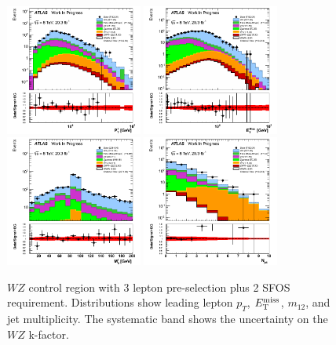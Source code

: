 \begin{figure}[htp]
\centering
\includegraphics[width=0.4\textwidth]{figures/WZ_CR/LeadingLeptonPt_histratio.png}
\includegraphics[width=0.4\textwidth]{figures/WZ_CR/MET_Et_histratio.png}
\includegraphics[width=0.4\textwidth]{figures/WZ_CR/InvariantMassSFOS_histratio.png}
\includegraphics[width=0.4\textwidth]{figures/WZ_CR/NJets_histratio.png}
\caption{$WZ$ control region with 3 lepton pre-selection plus 2 SFOS requirement. 
Distributions show leading lepton $p_{T}$, $E_{\mathrm{T}}^{\mathrm{miss}}$, $m_{12}$, and jet multiplicity. 
The systematic band shows the uncertainty on the $WZ$ k-factor.}
\label{fig:WZ_2SFOS_CR}
\end{figure}  

